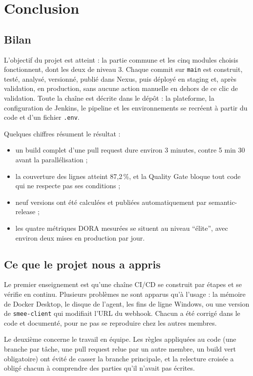 \documentclass[11pt,a4paper]{report}
\begin{document}
\chapter*{Conclusion}

\section*{Bilan}
L'objectif du projet est atteint : la partie commune et les cinq modules choisis fonctionnent, dont les deux de niveau 3. Chaque commit sur \texttt{main} est construit, testé, analysé, versionné, publié dans Nexus, puis déployé en staging et, après validation, en production, sans aucune action manuelle en dehors de ce clic de validation. Toute la chaîne est décrite dans le dépôt : la plateforme, la configuration de Jenkins, le pipeline et les environnements se recréent à partir du code et d'un fichier \texttt{.env}.

Quelques chiffres résument le résultat :
\begin{itemize}
  \item un build complet d'une pull request dure environ 3 minutes, contre 5 min 30 avant la parallélisation ;
  \item la couverture des lignes atteint 87,2\,\%, et la Quality Gate bloque tout code qui ne respecte pas ses conditions ;
  \item neuf versions ont été calculées et publiées automatiquement par semantic-release ;
  \item les quatre métriques DORA mesurées se situent au niveau \enquote{élite}, avec environ deux mises en production par jour.
\end{itemize}

\section*{Ce que le projet nous a appris}
Le premier enseignement est qu'une chaîne CI/CD se construit par étapes et se vérifie en continu. Plusieurs problèmes ne sont apparus qu'à l'usage : la mémoire de Docker Desktop, le disque de l'agent, les fins de ligne Windows, ou une version de \texttt{smee-client} qui modifiait l'URL du webhook. Chacun a été corrigé dans le code et documenté, pour ne pas se reproduire chez les autres membres.

Le deuxième concerne le travail en équipe. Les règles appliquées au code (une branche par tâche, une pull request relue par un autre membre, un build vert obligatoire) ont évité de casser la branche principale, et la relecture croisée a obligé chacun à comprendre des parties qu'il n'avait pas écrites.
\end{document}
